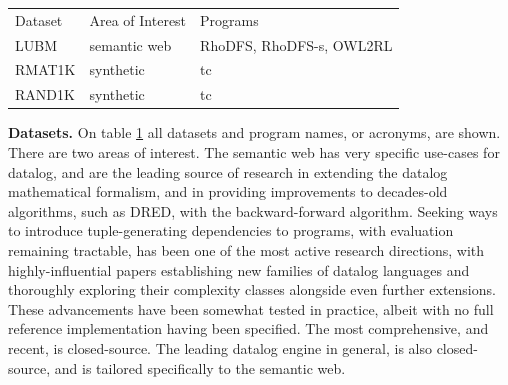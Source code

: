 \documentclass[sigconf,screen,review,natbib]{acmart}
\theoremstyle{definition}
\begin{document}
\begin{table}[]
	\begin{tabular}{|l|l|l|}
		Dataset & Area of Interest & Programs                 \\
		LUBM    & semantic web     & RhoDFS, RhoDFS-s, OWL2RL \\
		RMAT1K  & synthetic        & tc                       \\
		RAND1K  & synthetic        & tc                       \\
	\end{tabular}
	\label{table:datasets}
\end{table}

\textbf{Datasets.} On table \ref{table:datasets} all datasets and program names, or acronyms, are shown. There are two areas of interest. The semantic web has very
specific use-cases for datalog, and are the leading source of research in extending the datalog mathematical formalism, and in providing improvements to decades-old
algorithms, such as DRED, with the backward-forward algorithm\cite{dredbf}. Seeking ways to introduce tuple-generating dependencies to programs, with evaluation remaining
tractable, has been one of the most active research directions, with highly-influential papers establishing new families of datalog languages\cite{datalog_plus_minus} and
thoroughly exploring their complexity classes alongside even further extensions\cite{sticky,warded,monadic}. These advancements have been somewhat tested in practice, albeit
with no full reference implementation having been specified. The most comprehensive, and recent, is closed-source\cite{vadalog}. The leading datalog engine in general, is
also closed-source\cite{rdfox}, and is tailored specifically to the semantic web.
\end{document}

